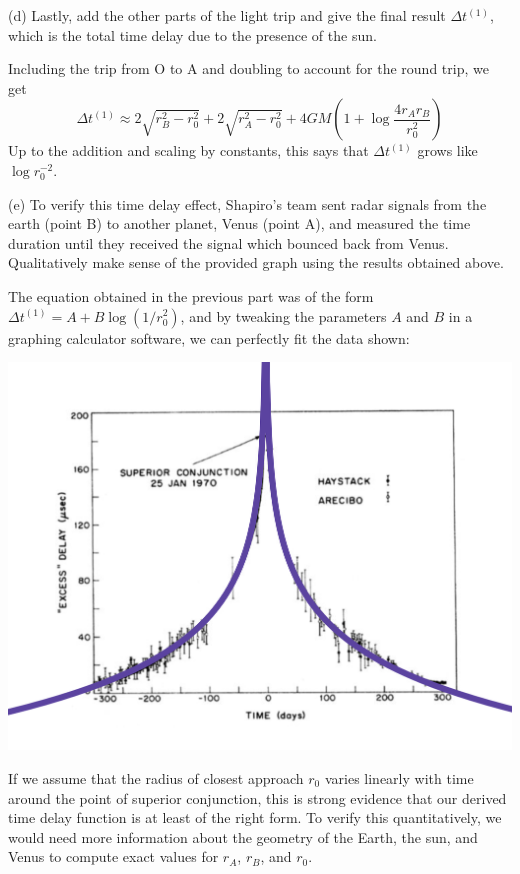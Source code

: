 \documentclass{../../templates/lkx_pset}
\begin{document}
\begin{parts}
  \begin{part}{(d)}
    Lastly, add the other parts of the light trip and give the final result $\Delta t^{(1)}$, which is the total time delay due to the presence of the sun.
  \end{part}

  Including the trip from O to A and doubling to account for the round trip, we get
  \[
    \Delta t^{(1)} \approx 
    2\sqrt{r_B^2-r_0^2} + 2\sqrt{r_A^2-r_0^2} + 4GM\left(1+\log\frac{4r_Ar_B}{r_0^2}\right)
  \]
  Up to the addition and scaling by constants, this says that $\Delta t^{(1)}$ grows like $\log r_0^{-2}$.

  \begin{part}{(e)}
    To verify this time delay effect, Shapiro's team sent radar signals from the earth (point B) to another planet, Venus (point A), and measured the time duration until they received the signal which bounced back from Venus. Qualitatively make sense of the provided graph using the results obtained above.
  \end{part}

  The equation obtained in the previous part was of the form $\Delta t^{(1)} = A+B\log (1/r_0^2)$, and by tweaking the parameters $A$ and $B$ in a graphing calculator software, we can perfectly fit the data shown:
  \begin{center}
    \includegraphics[scale=0.5]{timedelay.png}
  \end{center}
  If we assume that the radius of closest approach $r_0$ varies linearly with time around the point of superior conjunction, this is strong evidence that our derived time delay function is at least of the right form. To verify this quantitatively, we would need more information about the geometry of the Earth, the sun, and Venus to compute exact values for $r_A$, $r_B$, and $r_0$.
\end{parts}
\end{document}

